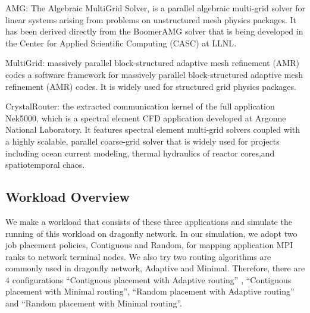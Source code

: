 \documentclass[conference,compsoc]{IEEEtran}
\begin{document}
AMG: The Algebraic MultiGrid Solver, is a parallel algebraic multi-grid solver for linear systems arising from problems on unstructured mesh physics packages. It has been derived directly from the BoomerAMG solver that is being developed in the Center for Applied Scientific Computing (CASC) at LLNL\cite{amg}.

MultiGrid: massively parallel block-structured adaptive mesh refinement (AMR) codes a software framework for massively parallel block-structured adaptive mesh refinement (AMR) codes\cite{boxlib}. It is widely used for structured grid physics packages.

CrystalRouter: the extracted communication kernel of the full application Nek5000\cite{nek5000}, which is a spectral element CFD application developed at Argonne National Laboratory\cite{crystalrouter}. It features spectral element multi-grid solvers coupled with a highly scalable, parallel coarse-grid solver that is widely used for projects including ocean current modeling, thermal hydraulics of reactor cores,and spatiotemporal chaos.


\subsection{Workload Overview}
\label{sec: workload overview}

We make a workload that consists of these three applications and simulate the running of this workload on dragonfly network. In our simulation, we adopt two job placement policies, Contiguous and Random, for mapping application MPI ranks to network terminal nodes. We also try two routing algorithms are commonly used in dragonfly network, Adaptive and Minimal. Therefore, there are 4 configurations “Contiguous placement with Adaptive routing” , “Contiguous placement with Minimal routing”, “Random placement with  Adaptive routing” and “Random placement with Minimal routing”. 
\end{document}
